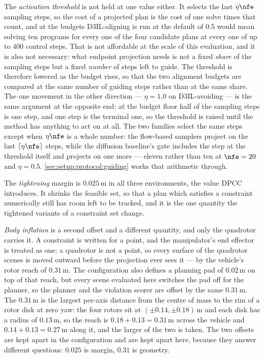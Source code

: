 The \emph{activation threshold} is not held at one value either. It selects the last $\eta\nfe$ sampling
steps, so the cost of a projected plan is the cost of one solve times that count, and at the budgets
D3IL-aligning is run at the default of $0.5$ would mean solving ten programs for every one of the four
candidate plans at every one of up to $400$ control steps. That is not affordable at the scale of this
evaluation, and it is also not necessary: what endpoint projection needs is not a fixed \emph{share} of
the sampling steps but a fixed \emph{number} of steps left to guide. The threshold is therefore lowered as
the budget rises, so that the two alignment budgets are compared at the same number of guiding steps
rather than at the same share. The one movement in the other direction --- $\eta=1.0$ on D3IL-avoiding ---
is the same argument at the opposite end: at the budget floor half of the sampling steps is one step, and
one step is the terminal one, so the threshold is raised until the method has anything to act on at all.
The two families select the same steps except when $\eta\nfe$ is a whole number: the flow-based samplers
project on the last $\lceil\eta\nfe\rceil$ steps, while the diffusion baseline's gate includes the step at
the threshold itself and projects on one more --- eleven rather than ten at $\nfe=20$ and $\eta=0.5$.
\autoref{sec:setup:protocol:guiding} works that arithmetic through.

The \emph{tightening} margin is $0.025$\,m in all three environments, the value \ac{DPCC} introduces. It
shrinks the feasible set, so that a plan which satisfies a constraint numerically still has room left to be
tracked, and it is the one quantity the tightened variants of a constraint set change.

\emph{Body inflation} is a second offset and a different quantity, and only the quadrotor carries it. A
constraint is written for a point, and the manipulator's end effector is treated as one; a quadrotor is
not a point, so every surface of the quadrotor scenes is moved outward before the projection ever sees it
--- by the vehicle's rotor reach of $0.31$\,m. The configuration also defines a planning pad of $0.02$\,m
on top of that reach, but every scene evaluated here switches the pad off for the planner, so the planner
and the violation scorer are offset by the same $0.31$\,m. The $0.31$\,m is the
largest per-axis distance from the centre of mass to the rim of a rotor disk at zero yaw: the four rotors
sit at $(\pm 0.14, \pm 0.18)$\,m and each disk has a radius of $0.13$\,m, so the reach is
$0.18+0.13=0.31$\,m across the vehicle and $0.14+0.13=0.27$\,m along it, and the larger of the two is
taken. The two offsets are kept apart in the configuration and are kept apart here, because they answer
different questions: $0.025$ is margin, $0.31$ is geometry.

